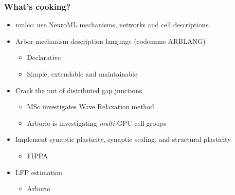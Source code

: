 \documentclass[t]{beamer}
\begin{document}
\begin{frame}
    \frametitle{What's cooking?}
    \begin{itemize}
    \item nmlcc: use NeuroML mechanisms, networks and cell descriptions.
    \item Arbor mechanism description language (codename ARBLANG)
    \begin{itemize}
    \item Declarative
    \item Simple, extendable and maintainable
    \end{itemize}
    \item Crack the nut of distributed gap junctions
    \begin{itemize}
    \item MSc investigates Wave Relaxation method
    \item Arborio is investigating \textit{multi-}GPU cell groups
    \end{itemize}
    \item Implement synaptic plasticity, synaptic scaling, and structural plasticity
    \begin{itemize}
    \item FIPPA
    \end{itemize}
    \item LFP estimation
    \begin{itemize}
    \item Arborio
    \end{itemize}
    \end{itemize}
\end{frame}
\end{document}
